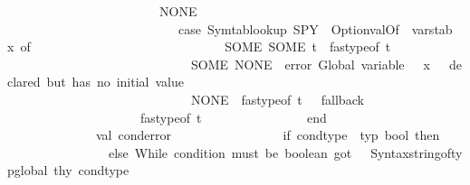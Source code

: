 \begin{isabellebody}
\ \ \ \ \ \ \ \ \ \ \ \ \ \ \ \ \ \ \ \ \ \ \ {\isacharbar}{\kern0pt}\ NONE\ {\isacharequal}{\kern0pt}{\isachargreater}{\kern0pt}\isanewline
\ \ \ \ \ \ \ \ \ \ \ \ \ \ \ \ \ \ \ \ \ \ \ \ \ \ \ {\isacharparenleft}{\kern0pt}case\ Symtab{\isachardot}{\kern0pt}lookup\ {\isacharparenleft}{\kern0pt}{\isacharbang}{\kern0pt}SPY\ {\isacharbar}{\kern0pt}{\isachargreater}{\kern0pt}\ Option{\isachardot}{\kern0pt}valOf\ {\isacharbar}{\kern0pt}{\isachargreater}{\kern0pt}\ {\isacharhash}{\kern0pt}varstab{\isacharparenright}{\kern0pt}\ x\ of\isanewline
\ \ \ \ \ \ \ \ \ \ \ \ \ \ \ \ \ \ \ \ \ \ \ \ \ \ \ \ \ \ SOME\ {\isacharparenleft}{\kern0pt}SOME\ t{\isacharprime}{\kern0pt}{\isacharparenright}{\kern0pt}\ {\isacharequal}{\kern0pt}{\isachargreater}{\kern0pt}\ fastype{\isacharunderscore}{\kern0pt}of\ t{\isacharprime}{\kern0pt}\isanewline
\ \ \ \ \ \ \ \ \ \ \ \ \ \ \ \ \ \ \ \ \ \ \ \ \ \ \ \ {\isacharbar}{\kern0pt}\ SOME\ NONE\ {\isacharequal}{\kern0pt}{\isachargreater}{\kern0pt}\ error\ {\isacharparenleft}{\kern0pt}{\isachardoublequote}{\kern0pt}Global\ variable\ {\isachardoublequote}{\kern0pt}\ {\isacharcircum}{\kern0pt}\ x\ {\isacharcircum}{\kern0pt}\ {\isachardoublequote}{\kern0pt}\ declared\ but\ has\ no\ initial\ value{\isachardoublequote}{\kern0pt}{\isacharparenright}{\kern0pt}\isanewline
\ \ \ \ \ \ \ \ \ \ \ \ \ \ \ \ \ \ \ \ \ \ \ \ \ \ \ \ {\isacharbar}{\kern0pt}\ NONE\ {\isacharequal}{\kern0pt}{\isachargreater}{\kern0pt}\ fastype{\isacharunderscore}{\kern0pt}of\ t{\isacharparenright}{\kern0pt}{\isacharparenright}{\kern0pt}\ \ {\isacharparenleft}{\kern0pt}{\isacharasterisk}{\kern0pt}\ fallback\ {\isacharasterisk}{\kern0pt}{\isacharparenright}{\kern0pt}\isanewline
\ \ \ \ \ \ \ \ \ \ \ \ \ \ \ \ \ \ {\isacharbar}{\kern0pt}\ {\isacharunderscore}{\kern0pt}\ {\isacharequal}{\kern0pt}{\isachargreater}{\kern0pt}\ fastype{\isacharunderscore}{\kern0pt}of\ t\isanewline
\ \ \ \ \ \ \ \ \ \ \ \ \ \ \ \ end\isanewline
\ \ \ \ \ \ \ \ \isanewline
\ \ \ \ \ \ \ \ \ \ \ \ \ \ val\ cond{\isacharunderscore}{\kern0pt}error\ {\isacharequal}{\kern0pt}\isanewline
\ \ \ \ \ \ \ \ \ \ \ \ \ \ \ \ if\ cond{\isacharunderscore}{\kern0pt}type\ {\isacharequal}{\kern0pt}\ {\isacharat}{\kern0pt}{\isacharbraceleft}{\kern0pt}typ\ bool{\isacharbraceright}{\kern0pt}\ then\ {\isacharbrackleft}{\kern0pt}{\isacharbrackright}{\kern0pt}\isanewline
\ \ \ \ \ \ \ \ \ \ \ \ \ \ \ \ else\ {\isacharbrackleft}{\kern0pt}{\isachardoublequote}{\kern0pt}While\ condition\ must\ be\ boolean{\isacharcomma}{\kern0pt}\ got{\isacharcolon}{\kern0pt}\ {\isachardoublequote}{\kern0pt}\ {\isacharcircum}{\kern0pt}\ Syntax{\isachardot}{\kern0pt}string{\isacharunderscore}{\kern0pt}of{\isacharunderscore}{\kern0pt}typ{\isacharunderscore}{\kern0pt}global\ thy\ cond{\isacharunderscore}{\kern0pt}type{\isacharbrackright}{\kern0pt}\isanewline

\end{isabellebody}
